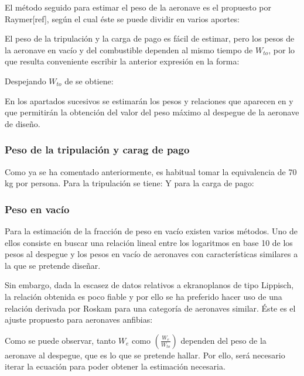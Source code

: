 El método seguido para estimar el peso de la aeronave es el propuesto por Raymer[ref], según el cual éste se puede dividir en varios aportes:

El peso de la tripulación y la carga de pago es fácil de estimar, pero los pesos de la aeronave en vacío y del combustible dependen al mismo tiempo de $W_{to}$, por lo que resulta conveniente escribir la anterior expresión en la forma:

Despejando $W_{to}$ de  se obtiene:

En los apartados sucesivos se estimarán los pesos y relaciones que aparecen en  y que permitirán la obtención del valor del peso máximo al despegue de la aeronave de diseño.


\subsubsection{Peso de la tripulación y carag de pago}
\label{sec:design:weights:cpl}

Como ya se ha comentado anteriormente, es habitual tomar la equivalencia de 70 kg por persona. Para la tripulación se tiene:
Y para la carga de pago:


\subsubsection{Peso en vacío}
\label{sec:design:weights:empty}

Para la estimación de la fracción de peso en vacío existen varios métodos. Uno de ellos consiste en buscar una relación lineal entre los logaritmos en base 10 de los pesos al despegue y los pesos en vacío de aeronaves con características similares a la que se pretende diseñar.

Sin embargo, dada la escasez de datos relativos a ekranoplanos de tipo Lippisch, la relación obtenida es poco fiable y por ello se ha preferido hacer uso de una relación derivada por Roskam para una categoría de aeronaves similar. Éste es el ajuste propuesto para aeronaves anfibias:

Como se puede observar, tanto $W_e$ como $\left( \frac{W_e}{W_{to}} \right)$ dependen del peso de la aeronave al despegue, que es lo que se pretende hallar. Por ello, será necesario iterar la ecuación  para poder obtener la estimación necesaria.


